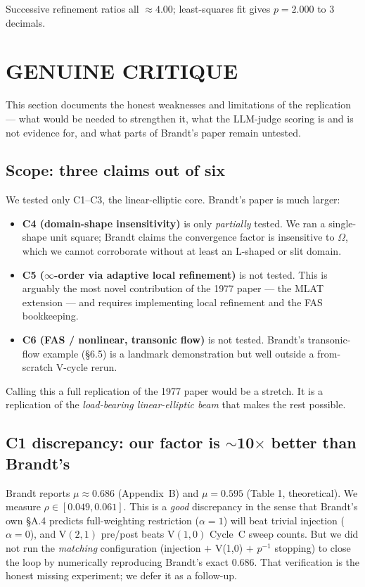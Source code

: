 \documentclass[11pt]{article}
\begin{document}
Successive refinement ratios all $\approx 4.00$; least-squares fit gives $\boxed{p = 2.000}$ to 3 decimals.

\section{GENUINE CRITIQUE}
\label{sec:critique}

This section documents the honest weaknesses and limitations of the replication --- what would be needed to strengthen it, what the LLM-judge scoring is and is not evidence for, and what parts of Brandt's paper remain untested.

\subsection{Scope: three claims out of six}
We tested only C1--C3, the linear-elliptic core. Brandt's paper is much larger:
\begin{itemize}
\item \textbf{C4 (domain-shape insensitivity)} is only \emph{partially} tested. We ran a single-shape unit square; Brandt claims the convergence factor is insensitive to $\Omega$, which we cannot corroborate without at least an L-shaped or slit domain.
\item \textbf{C5 ($\infty$-order via adaptive local refinement)} is not tested. This is arguably the most novel contribution of the 1977 paper --- the MLAT extension --- and requires implementing local refinement and the FAS bookkeeping.
\item \textbf{C6 (FAS / nonlinear, transonic flow)} is not tested. Brandt's transonic-flow example (\S 6.5) is a landmark demonstration but well outside a from-scratch V-cycle rerun.
\end{itemize}
Calling this a full replication of the 1977 paper would be a stretch. It is a replication of the \emph{load-bearing linear-elliptic beam} that makes the rest possible.

\subsection{C1 discrepancy: our factor is $\sim$10$\times$ better than Brandt's}
Brandt reports $\mu \approx 0.686$ (Appendix~B) and $\mu = 0.595$ (Table 1, theoretical). We measure $\rho \in [0.049, 0.061]$. This is a \emph{good} discrepancy in the sense that Brandt's own \S A.4 predicts full-weighting restriction ($\alpha=1$) will beat trivial injection ($\alpha=0$), and $\text{V}(2,1)$ pre/post beats $\text{V}(1,0)$ Cycle~C sweep counts. But we did not run the \emph{matching} configuration (injection $+$ V(1,0) $+$ $p^{-1}$ stopping) to close the loop by numerically reproducing Brandt's exact 0.686. That verification is the honest missing experiment; we defer it as a follow-up.
\end{document}
